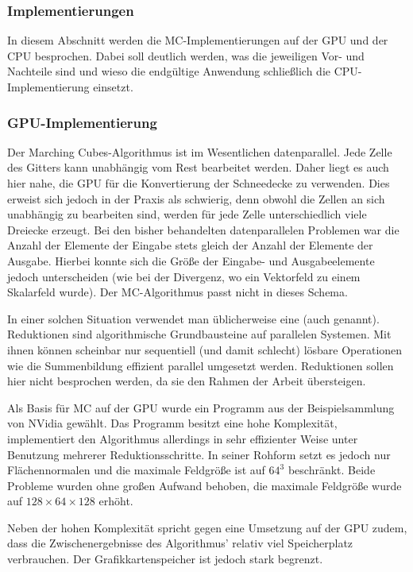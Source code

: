 \subsubsection{Implementierungen}

In diesem Abschnitt werden die MC-Implementierungen auf der GPU und
der CPU besprochen. Dabei soll deutlich werden, was die jeweiligen
Vor- und Nachteile sind und wieso die endgültige Anwendung schließlich
die CPU-Implementierung einsetzt.

\subsubsection{GPU-Implementierung}

Der Marching Cubes-Algorithmus ist im Wesentlichen datenparallel. Jede
Zelle des Gitters kann unabhängig vom Rest bearbeitet werden. Daher
liegt es auch hier nahe, die GPU für die Konvertierung der Schneedecke
zu verwenden. Dies erweist sich jedoch in der Praxis als schwierig,
denn obwohl die Zellen an sich unabhängig zu bearbeiten sind, werden
für jede Zelle unterschiedlich viele Dreiecke erzeugt. Bei den bisher
behandelten datenparallelen Problemen war die Anzahl der Elemente der
Eingabe stets gleich der Anzahl der Elemente der Ausgabe. Hierbei
konnte sich die Größe der Eingabe- und Ausgabeelemente jedoch
unterscheiden (wie bei der Divergenz, wo ein Vektorfeld zu einem
Skalarfeld wurde). Der MC-Algorithmus passt nicht in dieses Schema.

In einer solchen Situation verwendet man üblicherweise eine
 (auch 
genannt\cite{Blelloch1989}). Reduktionen sind algorithmische
Grundbausteine auf parallelen Systemen. Mit ihnen können scheinbar nur
sequentiell (und damit schlecht) lösbare Operationen wie die
Summenbildung effizient parallel umgesetzt werden. Reduktionen sollen
hier nicht besprochen werden, da sie den Rahmen der Arbeit übersteigen.

Als Basis für MC auf der GPU wurde ein Programm aus der
Beispielsammlung von NVidia gewählt\cite{nvidiamc}. Das Programm
besitzt eine hohe Komplexität, implementiert den Algorithmus
allerdings in sehr effizienter Weise unter Benutzung mehrerer
Reduktionsschritte. In seiner Rohform setzt es jedoch nur
Flächennormalen und die maximale Feldgröße ist auf $64^3$
beschränkt. Beide Probleme wurden ohne großen Aufwand behoben, die
maximale Feldgröße wurde auf $128 \times 64 \times 128$ erhöht.

Neben der hohen Komplexität spricht gegen eine Umsetzung auf der GPU
zudem, dass die Zwischenergebnisse des Algorithmus' relativ viel
Speicherplatz verbrauchen. Der Grafikkartenspeicher ist jedoch stark
begrenzt.

